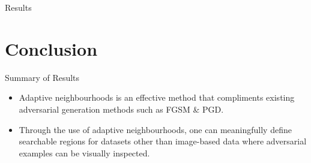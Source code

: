 \documentclass[smaller]{beamer}
\begin{document}
\begin{frame}[label={sec:org4c0e0a2}]{Results}
\begin{table}
\caption{\label{tab:adv_fscore}$F_1$ score performance on the WAVES dataset using Faster R-CNN. Numbers highlighted in a bold font face indicate the best achieving adversarial attack for each form of defence.}
\centering
\begin{adjustbox}{center}
\end{adjustbox}
\end{table}
\end{frame}

\section{Conclusion}
\label{sec:org20c5849}

\begin{frame}[label={sec:org25b9fd2}]{Summary of Results}
\begin{itemize}
\item Adaptive neighbourhoods is an effective method that compliments existing
adversarial generation methods such as FGSM \& PGD.
\item Through the use of adaptive neighbourhoods, one can meaningfully define searchable
regions for datasets other than image-based data where adversarial examples can be
visually inspected.
\end{itemize}
\end{frame}
\end{document}
